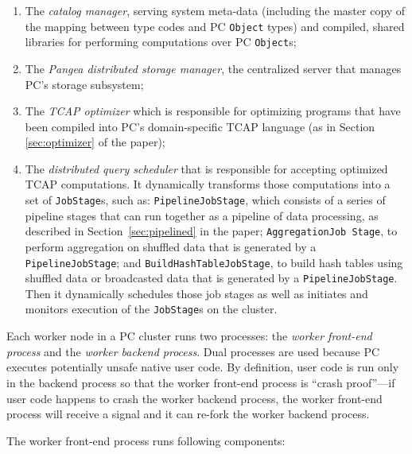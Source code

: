 \begin{enumerate}
\item The \emph{catalog manager}, serving system meta-data (including the master copy of
the mapping between type codes and PC \texttt{Object} types) and compiled, shared libraries
for performing computations over PC \texttt{Object}s;
\item The \emph{Pangea distributed storage manager}, 
the centralized server that manages PC's storage subsystem; 
\item The \emph{TCAP optimizer} which is responsible for optimizing
  programs that have been compiled into PC's domain-specific TCAP
  language (as in 
Section \ref{sec:optimizer} of the paper);
\item The \emph{distributed query scheduler} that is responsible for accepting optimized TCAP computations.
It dynamically transforms those computations into a set of \texttt{JobStage}s,
such as:
\texttt{PipelineJobStage}, which consists of a series of pipeline
stages that can run together as a pipeline of data processing, as
described in Section~\ref{sec:pipelined} in the paper;
\texttt{AggregationJob Stage}, to perform aggregation on shuffled data that is
generated by a \texttt{PipelineJobStage}; and \texttt{BuildHashTableJobStage}, to build hash
tables using shuffled data or broadcasted data that is generated by a
\texttt{PipelineJobStage}. Then it
dynamically schedules those job stages as well as initiates and
monitors execution of the \texttt{JobStage}s on the cluster.
\end{enumerate}

\noindent 
Each worker node in a PC cluster runs two processes: the \emph{worker front-end process} and the \emph{worker backend process}.
Dual processes are used because PC executes potentially unsafe native user code.  By definition, user code is run only in the backend process so that the
worker front-end process is ``crash proof''---if            
user code happens to crash the worker backend process, the worker front-end process will receive a signal and it can re-fork the worker
backend process.

The worker front-end process runs following components:

